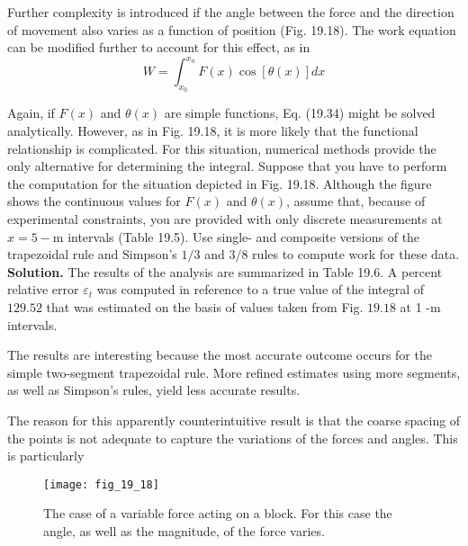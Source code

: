 \documentclass[../main.tex]{subfiles}
\begin{document}
Further complexity is introduced if the angle between the force and the direction of movement also varies as a function of position (Fig. 19.18). The work equation can be modified further to account for this effect, as in
\begin{equation}
    \tag{19.34}
W=\int_{x_{0}}^{x_{n}} F(x) \cos [\theta(x)] d x
\end{equation}

Again, if $F(x)$ and $\theta(x)$ are simple functions, Eq. (19.34) might be solved analytically. However, as in Fig. 19.18, it is more likely that the functional relationship is complicated. For this situation, numerical methods provide the only alternative for determining the integral.
Suppose that you have to perform the computation for the situation depicted in Fig. 19.18. Although the figure shows the continuous values for $F(x)$ and $\theta(x)$, assume that, because of experimental constraints, you are provided with only discrete measurements at $x=5-\mathrm{m}$ intervals (Table 19.5). Use single- and composite versions of the trapezoidal rule and Simpson's $1 / 3$ and $3 / 8$ rules to compute work for these data.
\vspace{0.5cm}\\
\noindent \textbf{Solution.} The results of the analysis are summarized in Table 19.6. A percent relative error $\varepsilon_{t}$ was computed in reference to a true value of the integral of $129.52$ that was estimated on the basis of values taken from Fig. $19.18$ at 1 -m intervals.

The results are interesting because the most accurate outcome occurs for the simple two-segment trapezoidal rule. More refined estimates using more segments, as well as Simpson's rules, yield less accurate results.

The reason for this apparently counterintuitive result is that the coarse spacing of the points is not adequate to capture the variations of the forces and angles. This is particularly

\begin{figure}[H]
    \centering
    \texttt{[image: fig\_19\_18]}
   \caption{\textsf{The case of a variable force acting on a block. For this case the angle, as well as the
   magnitude, of the force varies.}}\label{fig:fig_19_18}
\end{figure}
\end{document}
